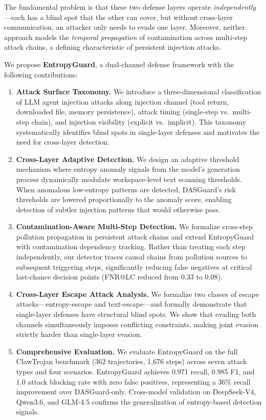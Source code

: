 \documentclass[conference]{IEEEtran}
\begin{document}
The fundamental problem is that these two defense layers operate \emph{independently}---each has a blind spot that the other can cover, but without cross-layer communication, an attacker only needs to evade one layer. Moreover, neither approach models the \emph{temporal propagation} of contamination across multi-step attack chains, a defining characteristic of persistent injection attacks.

We propose \textbf{EntropyGuard}, a dual-channel defense framework with the following contributions:

\begin{enumerate}
    \item \textbf{Attack Surface Taxonomy.} We introduce a three-dimensional classification of LLM agent injection attacks along injection channel (tool return, downloaded file, memory persistence), attack timing (single-step vs.\ multi-step chain), and injection visibility (explicit vs.\ implicit). This taxonomy systematically identifies blind spots in single-layer defenses and motivates the need for cross-layer detection.

    \item \textbf{Cross-Layer Adaptive Detection.} We design an adaptive threshold mechanism where entropy anomaly signals from the model's generation process dynamically modulate workspace-level text scanning thresholds. When anomalous low-entropy patterns are detected, DASGuard's risk thresholds are lowered proportionally to the anomaly score, enabling detection of subtler injection patterns that would otherwise pass.

    \item \textbf{Contamination-Aware Multi-Step Detection.} We formalize cross-step pollution propagation in persistent attack chains and extend EntropyGuard with contamination dependency tracking. Rather than treating each step independently, our detector traces causal chains from pollution sources to subsequent triggering steps, significantly reducing false negatives at critical last-chance decision points (FNR@LC reduced from 0.33 to 0.08).

    \item \textbf{Cross-Layer Escape Attack Analysis.} We formalize two classes of escape attacks---entropy-escape and text-escape---and formally demonstrate that single-layer defenses have structural blind spots. We show that evading both channels simultaneously imposes conflicting constraints, making joint evasion strictly harder than single-layer evasion.

    \item \textbf{Comprehensive Evaluation.} We evaluate EntropyGuard on the full ClawTrojan benchmark (362 trajectories, 1,676 steps) across seven attack types and four scenarios. EntropyGuard achieves 0.971 recall, 0.985 F1, and 1.0 attack blocking rate with zero false positives, representing a 36\% recall improvement over DASGuard-only. Cross-model validation on DeepSeek-V4, Qwen3.6, and GLM-4.5 confirms the generalization of entropy-based detection signals.
\end{enumerate}
\end{document}
